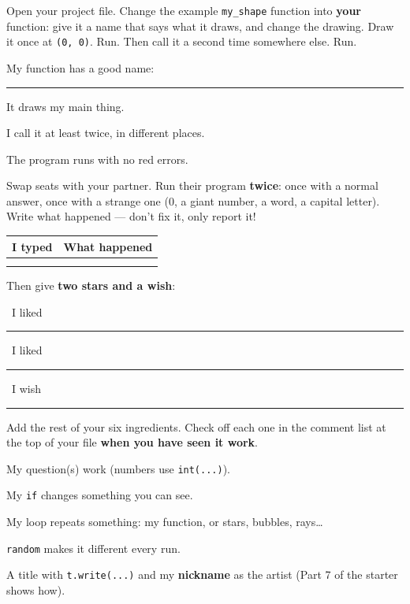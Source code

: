 \begin{exercise}
Open your project file. Change the example \texttt{my\_shape} function into \textbf{your} function: give it a name that says what it draws, and change the drawing. Draw it once at \texttt{(0, 0)}. Run. Then call it a second time somewhere else. Run.
\begin{checklist}
  \item My function has a good name: \rule{5cm}{0.4pt}
  \item It draws my main thing.
  \item I call it at least twice, in different places.
  \item The program runs with no red errors.
\end{checklist}
\end{exercise}

\begin{exercise}
Swap seats with your partner. Run their program \textbf{twice}: once with a normal answer, once with a strange one (0, a giant number, a word, a capital letter). Write what happened --- don't fix it, only report it!
\begin{center}
\renewcommand{\arraystretch}{1.6}
\begin{tabular}{@{}p{4cm}p{9.4cm}@{}}
\toprule
I typed & What happened\\
\midrule
 & \\ \midrule
 & \\
\bottomrule
\end{tabular}
\end{center}
Then give \textbf{two stars and a wish}:\par
\faStar\ I liked \rule{11.5cm}{0.4pt}\par\smallskip
\faStar\ I liked \rule{11.5cm}{0.4pt}\par\smallskip
\faMagic\ I wish \rule{11.5cm}{0.4pt}
\end{exercise}

\begin{exercise}
Add the rest of your six ingredients. Check off each one in the comment list at the top of your file \textbf{when you have seen it work}.
\begin{checklist}
  \item My question(s) work (numbers use \texttt{int(...)}).
  \item My \texttt{if} changes something you can see.
  \item My loop repeats something: my function, or stars, bubbles, rays\ldots
  \item \texttt{random} makes it different every run.
  \item A title with \texttt{t.write(...)} and my \textbf{nickname} as the artist (Part 7 of the starter shows how).
\end{checklist}
\end{exercise}

